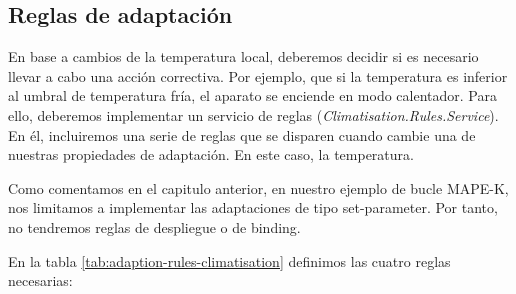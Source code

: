 \subsection{Reglas de adaptación}

En base a cambios de la temperatura local, deberemos decidir si es necesario llevar a cabo una acción correctiva. Por ejemplo, que si la temperatura es inferior al umbral de temperatura fría, el aparato se enciende en modo calentador. Para ello, deberemos implementar un servicio de reglas (\emph{Climatisation.Rules.Service}). En él, incluiremos una serie de reglas que se disparen cuando cambie una de nuestras propiedades de adaptación. En este caso, la temperatura.

Como comentamos en el capitulo anterior, en nuestro ejemplo de bucle MAPE-K, nos limitamos a implementar las adaptaciones de tipo set-parameter. Por tanto, no tendremos reglas de despliegue o de binding.

En la tabla \ref{tab:adaption-rules-climatisation} definimos las cuatro reglas necesarias:


